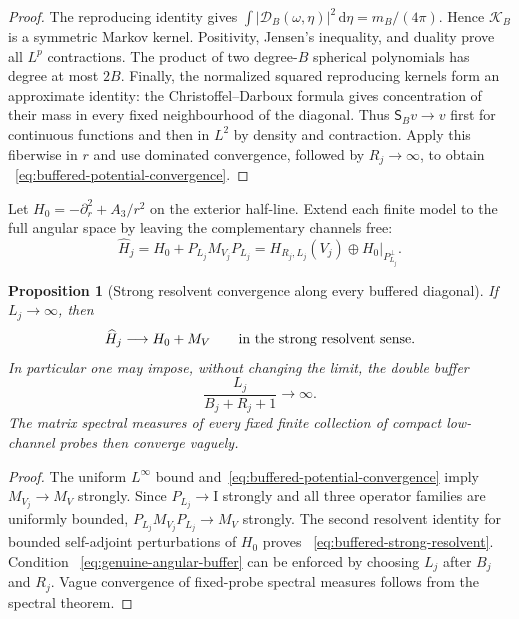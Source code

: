 \documentclass[11pt]{article}
\newcommand{\Id}{\mathrm I}
\newcommand{\dd}{\,\mathrm d}
\newtheorem{proposition}[theorem]{Proposition}
\theoremstyle{definition}
\theoremstyle{remark}
\begin{document}
\begin{proof}
The reproducing identity gives
$\int|\mathcal D_B(\omega,\eta)|^2\dd\eta=m_B/(4\pi)$.
Hence $\mathcal K_B$ is a symmetric Markov kernel.  Positivity, Jensen's
inequality, and duality prove all $L^p$ contractions.  The product of two
degree-$B$ spherical polynomials has degree at most $2B$.  Finally, the
normalized squared reproducing kernels form an approximate identity: the
Christoffel--Darboux formula gives concentration of their mass in every fixed
neighbourhood of the diagonal.  Thus $\mathsf S_Bv\to v$ first for continuous
functions and then in $L^2$ by density and contraction.  Apply this fiberwise
in $r$ and use dominated convergence, followed by $R_j\to\infty$, to obtain
~\eqref{eq:buffered-potential-convergence}.
\end{proof}

Let $H_0=-\partial_r^2+A_3/r^2$ on the exterior half-line.  Extend each finite
model to the full angular space by leaving the complementary channels free:
\begin{equation}
 \widehat H_j
 =H_0+P_{L_j}M_{V_j}P_{L_j}
 =H_{R_j,L_j}(V_j)\oplus H_0\big|_{P_{L_j}^\perp}.
 \label{eq:extended-buffered-model}
\end{equation}

\begin{proposition}[Strong resolvent convergence along every buffered diagonal]
\label{prop:buffered-strong-resolvent}
If $L_j\to\infty$, then
\begin{equation}
 \widehat H_j\longrightarrow H_0+M_V
 \qquad\hbox{in the strong resolvent sense}.
 \label{eq:buffered-strong-resolvent}
\end{equation}
In particular one may impose, without changing the limit, the double buffer
\begin{equation}
 \frac{L_j}{B_j+R_j+1}\longrightarrow\infty.
 \label{eq:genuine-angular-buffer}
\end{equation}
The matrix spectral measures of every fixed finite collection of compact
low-channel probes then converge vaguely.
\end{proposition}

\begin{proof}
The uniform $L^\infty$ bound and~\eqref{eq:buffered-potential-convergence}
imply $M_{V_j}\to M_V$ strongly.  Since $P_{L_j}\to\Id$ strongly and all
three operator families are uniformly bounded,
$P_{L_j}M_{V_j}P_{L_j}\to M_V$ strongly.  The second resolvent identity for
bounded self-adjoint perturbations of $H_0$ proves
~\eqref{eq:buffered-strong-resolvent}.  Condition
~\eqref{eq:genuine-angular-buffer} can be enforced by choosing $L_j$ after
$B_j$ and $R_j$.  Vague convergence of fixed-probe spectral measures follows
from the spectral theorem.
\end{proof}
\end{document}
